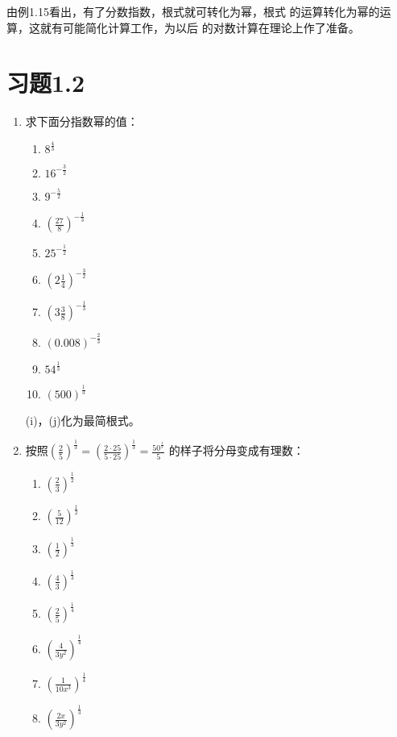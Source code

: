 由例1.15看出，有了分数指数，根式就可转化为幂，根式
的运算转化为幂的运算，这就有可能简化计算工作，为以后
的对数计算在理论上作了准备。

\section*{习题1.2}

\begin{enumerate}
    \item 求下面分指数幂的值：
\begin{multicols}{3}
\begin{enumerate}
    \item $8^{\tfrac{4}{3}}$
    \item $16^{-\tfrac{3}{2}}$
    \item $9^{-\tfrac{5}{2}}$
    \item $\left(\frac{27}{8}\right)^{-\tfrac{1}{3}}$
    \item $25^{-\tfrac{1}{2}}$
    \item $\left(2\frac{1}{4}\right)^{-\tfrac{3}{2}}$
    \item $\left(3\frac{3}{8}\right)^{-\tfrac{1}{3}}$
    \item $(0.008)^{-\tfrac{2}{3}}$
    \item $54^{\tfrac{1}{3}}$
    \item $(500)^{\tfrac{1}{3}}$
\end{enumerate}
\end{multicols}
(i)，(j)化为最简根式。

\item 按照$\left(\frac{2}{5}\right)^{\tfrac{1}{3}}=\left(\frac{2\cdot 25}{5\cdot 25}\right)^{\tfrac{1}{3}}=\frac{50^{\tfrac{1}{3}}}{5} $ 的样子将分母变成有理数：
\begin{multicols}{3}
\begin{enumerate}
    \item $\left(\frac{2}{3}\right)^{\tfrac{1}{2}}$
    \item $\left(\frac{5}{12}\right)^{\tfrac{1}{2}}$
    \item $\left(\frac{1}{2}\right)^{\tfrac{1}{3}}$
    \item $\left(\frac{4}{3}\right)^{\tfrac{1}{3}}$
    \item $\left(\frac{2}{5}\right)^{\tfrac{1}{4}}$
    \item $\left(\frac{4}{3y^2}\right)^{\tfrac{1}{4}}$
    \item $\left(\frac{1}{10x^3}\right)^{\tfrac{1}{4}}$
    \item $\left(\frac{2x}{3y^2}\right)^{\tfrac{1}{3}}$
\end{enumerate}
\end{multicols}


\end{enumerate}
